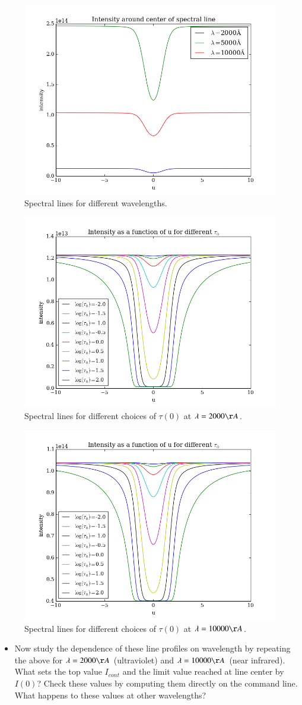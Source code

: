 \documentclass{aa}   %
\begin{document}
\begin{figure}
 \includegraphics[width=.49\textwidth]{emergent_line_orig.png}
 \caption{Spectral lines for different wavelengths.}
 \label{emergent_line_orig}
\end{figure}
\begin{figure}
 \includegraphics[width=.49\textwidth]{emergent_line_log_2000.png}
 \caption{Spectral lines for different choices of $\tau(0)$ at $\lambda = 2000 \AA$.}
 \label{emergent_line_log_2000} 
\end{figure}
\begin{figure}
 \includegraphics[width=.49\textwidth]{emergent_line_log_10000.png}
 \caption{Spectral lines for different choices of $\tau(0)$ at $\lambda = 10000 \AA$.}
 \label{emergent_line_log_10000} 
\end{figure}
\begin{itemize}
 \item
 Now study the dependence of these line profiles on wavelength by repeating the above for $\lambda = 2000 \AA$ (ultraviolet) and $\lambda = 10000 \AA$ (near infrared). What sets the top value $I_{cont}$ and the limit value reached at line center 	by $I(0)$? Check these values by computing them directly on the command line. What happens to these values at other wavelengths?
\end{itemize}
\end{document}
